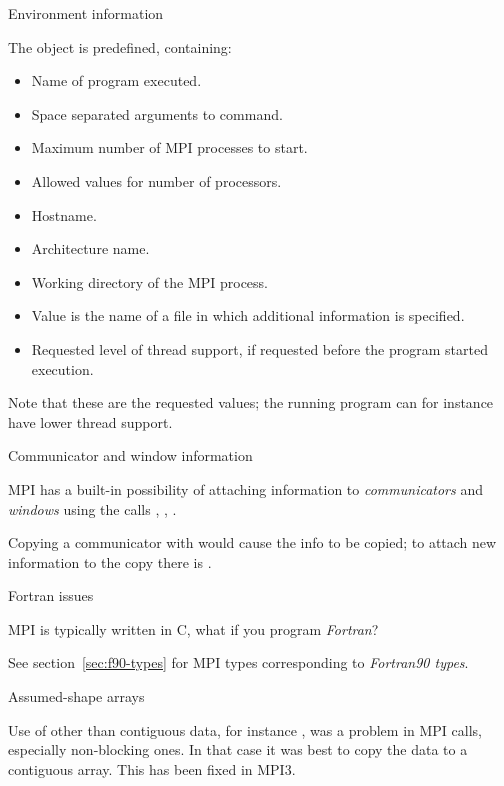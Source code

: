  {Environment information}
\label{sec:mpi-info-env}

The object  is predefined, containing:
\begin{itemize}
\item {}
  Name of program executed.
\item  {}
  Space separated arguments to command.
\item  {}
  Maximum number of MPI processes to start.
\item   {}
  Allowed values for number of processors.
\item   {}
  Hostname.
\item   {}
  Architecture name.
\item   {}
  Working directory of the MPI process.
\item   {}
  Value is the name of a file in which additional information is specified.
\item   {}
  Requested level of thread support, if requested before the program started execution.
\end{itemize}
Note that these are the requested values; the running program can for instance
have lower thread support.

 {Communicator and window information}

MPI has a built-in possibility of attaching information to
\emph{communicators}
and
\emph{windows}
using the calls
,
,
.

Copying a communicator with  would cause
the info to be copied; to attach new information to the copy there is
.

 {Fortran issues}
\label{sec:mpi-fortran}

MPI is typically written in C, what if you program \emph{Fortran}?

See section~\ref{sec:f90-types} for MPI types corresponding to
\emph{Fortran90 types}.

 {Assumed-shape arrays}

Use of other than contiguous data, for instance , was a
problem in MPI calls, especially non-blocking ones. In that case it
was best to copy the data to a contiguous array. This has been fixed
in MPI3.

